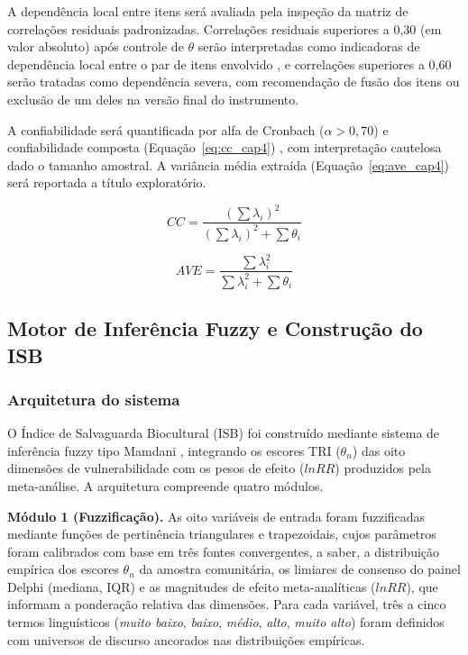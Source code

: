 \documentclass[pdflatex,sn-basic]{sn-jnl}%
\theoremstyle{thmstyleone}%
\theoremstyle{thmstyletwo}%
\theoremstyle{thmstylethree}%
\begin{document}
A dependência local entre itens será avaliada pela inspeção da matriz de correlações residuais padronizadas. Correlações residuais superiores a 0,30 (em valor absoluto) após controle de $\theta$ serão interpretadas como indicadoras de dependência local entre o par de itens envolvido \cite{Christensen2017}, e correlações superiores a 0,60 serão tratadas como dependência severa, com recomendação de fusão dos itens ou exclusão de um deles na versão final do instrumento.

A confiabilidade será quantificada por alfa de Cronbach ($\alpha > 0{,}70$) \cite{Cronbach1951} e confiabilidade composta (Equação~\ref{eq:cc_cap4}) \cite{Fornell1981}, com interpretação cautelosa dado o tamanho amostral. A variância média extraída (Equação~\ref{eq:ave_cap4}) será reportada a título exploratório.

\begin{equation}
CC = \frac{(\sum\lambda_i)^2}{(\sum\lambda_i)^2 + \sum\theta_i}
\label{eq:cc}
\end{equation}

\begin{equation}
AVE = \frac{\sum\lambda_i^2}{\sum\lambda_i^2 + \sum\theta_i}
\label{eq:ave}
\end{equation}


\subsection{Motor de Inferência Fuzzy e Construção do ISB}\label{subsec:fuzzy}

\subsubsection{Arquitetura do sistema}\label{subsubsec:arquitetura}

O Índice de Salvaguarda Biocultural (ISB) foi construído mediante sistema de inferência fuzzy tipo Mamdani \citep{Mamdani1975}, integrando os escores TRI ($\theta_n$) das oito dimensões de vulnerabilidade com os pesos de efeito ($lnRR$) produzidos pela meta-análise. A arquitetura compreende quatro módulos.

\textbf{Módulo 1 (Fuzzificação).} As oito variáveis de entrada foram fuzzificadas mediante funções de pertinência triangulares e trapezoidais, cujos parâmetros foram calibrados com base em três fontes convergentes, a saber, a distribuição empírica dos escores $\theta_n$ da amostra comunitária, os limiares de consenso do painel Delphi (mediana, IQR) e as magnitudes de efeito meta-analíticas ($lnRR$), que informam a ponderação relativa das dimensões. Para cada variável, três a cinco termos linguísticos (\textit{muito baixo}, \textit{baixo}, \textit{médio}, \textit{alto}, \textit{muito alto}) foram definidos com universos de discurso ancorados nas distribuições empíricas.
\end{document}
